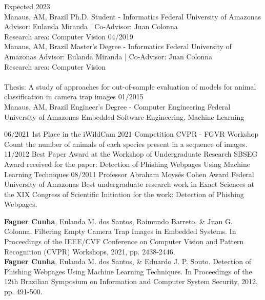 \documentclass[10pt]{developercv} %
\begin{document}

\begin{entrylist}
  \entry
  {Expected 2023\\\footnotesize{Manaus, AM, Brazil}}
  {Ph.D. Student - Informatics}
  {Federal University of Amazonas}
  {Advisor: Eulanda Miranda | Co-Advisor: Juan Colonna\\
  Research area: Computer Vision}
  \entry
  {04/2019\\\footnotesize{Manaus, AM, Brazil}}
  {Master's Degree - Informatics}
  {Federal University of Amazonas}
  {Advisor: Eulanda Miranda | Co-Advisor: Juan Colonna\\
  Research area: Computer Vision\\\\
 Thesis: A study of approaches for out-of-sample evaluation of models for 
animal classification in camera trap images}
  \entry
  {01/2015\\\footnotesize{Manaus, AM, Brazil}}
  {Engineer's Degree - Computer Engineering}
  {Federal University of Amazonas}
  {Embedded Software Engineering, Machine Learning}
\end{entrylist}



\begin{entrylist}
  \entry
  {06/2021}
  {1st Place in the iWildCam 2021 Competition}
  {CVPR - FGVR Workshop}
  {Count the number of animals of each species present in a sequence of images.}
  \entry
  {11/2012}
  {Best Paper Award at the Workshop of Undergraduate Research}
  {SBSEG}
  {Award received for the paper: Detection 
of Phishing Webpages Using Machine Learning Techniques}
  \entry
  {08/2011}
  {Professor Abraham Moysés Cohen Award}
  {Federal University of Amazonas}
  {Best undergraduate research work in Exact Sciences at the XIX Congress of 
Scientific Initiation for the work: Detection of Phishing Webpages.}
\end{entrylist}



\begin{minipage}[t]{\textwidth}

\textbf{Fagner Cunha}, Eulanda M. dos Santos, Raimundo Barreto, \& Juan G. 
Colonna. Filtering Empty Camera Trap Images in Embedded Systems. In Proceedings 
of the IEEE/CVF Conference on Computer Vision and Pattern 
Recognition (CVPR) Workshops, 2021, pp. 2438-2446.\\

\textbf{Fagner Cunha}, Eulanda M. dos Santos, \& Eduardo J. P. Souto. Detection 
of Phishing Webpages Using Machine Learning Techniques. In Proceedings 
of the 12th Brazilian Symposium on Information and Computer System Security, 
2012, pp. 491-500.
\end{minipage}
\end{document}
